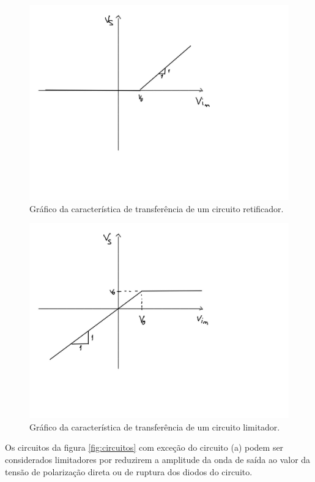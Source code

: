 \documentclass{abntex2}
\begin{document}
\begin{figure}[h]
  \centering
  \includegraphics[width=.8\textwidth]{grafRetificador.jpeg}
  \caption{Gráfico da característica de transferência de um circuito retificador.}
  \label{fig:retificador}
\end{figure}

\begin{figure}[h]
  \centering
  \includegraphics[width=.8\textwidth]{grafLimitador.jpg}
  \caption{Gráfico da característica de transferência de um circuito limitador.}
  \label{fig:limitador}
\end{figure}

Os circuitos da figura \ref{fig:circuitos} com exceção do circuito (a) podem ser considerados limitadores por reduzirem a amplitude da onda de saída ao valor da tensão de polarização direta ou de ruptura dos diodos do circuito.
\end{document}
